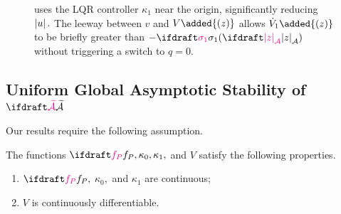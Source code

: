 \begin{example}[LQR]
\begin{figure}[htbp]
{        uses the LQR controller $\kappa_1$ near the origin, 
        significantly reducing $\left\lvert u\right\rvert.$ The leeway between $v$ and $V\added{(z)}$ 
        allows $\dot V_1\added{(z)}$ to be briefly greater 
        than $-\sigmaone(\distA{z})$ without 
        triggering a switch to $q=0.$
        }
        \label{fig:lqr example_1}
    \end{figure}
\end{example}

\subsection{Uniform Global Asymptotic Stability of $\calAX$}
\label{sec:analysis}

Our results require the following assumption.
\begin{assumption} The functions $\fp, \kappa_0, \kappa_1,$ and $V$ 
    satisfy the following properties.
    \label{assump:regularity}
    \setupAssumption[B]
    \begin{enumerate}
        \item \label{assump:fp continuous} $\fp,$ 
        $\kappa_0,$ and $\kappa_1$ are continuous;
        \item \label{assump:V differentiable} 
        $V$ is continuously differentiable. 
    \end{enumerate}
\end{assumption}

